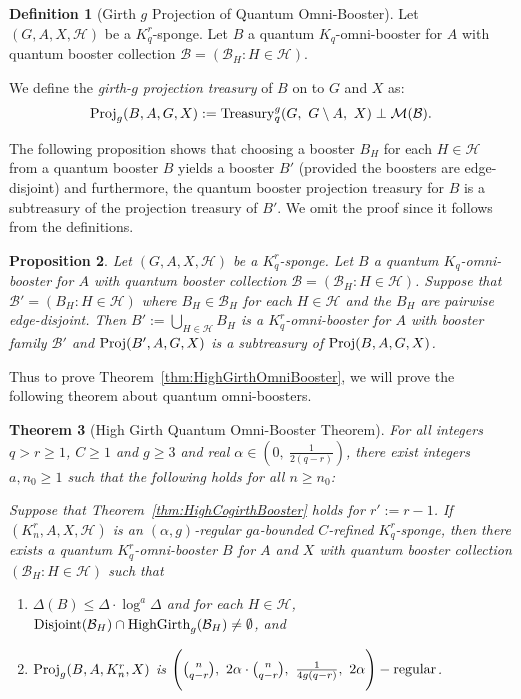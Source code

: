 \documentclass[11pt]{article}
\newcommand{\mc}[1]{\mathcal{#1}}
\newcounter{i}
\theoremstyle{plain}
\newtheorem{thm}{Theorem}[section]
\newtheorem{proposition}[thm]{Proposition}
\theoremstyle{plain} %
\theoremstyle{definition}
\newtheorem{definition}[thm]{Definition}
\begin{document}
\begin{definition}[Girth $g$ Projection of Quantum Omni-Booster]\label{def:QuantumOmniBoosterProj}
Let $(G,A,X,\mc{H})$ be a $K_q^r$-sponge. Let $B$ a quantum $K_q$-omni-booster for $A$ with quantum booster collection $\mathcal{B} = (\mathcal{B}_H: H\in\mathcal{H})$.

We define the \emph{girth-$g$ projection treasury} of $B$ on to $G$ and $X$ as: 
$${\rm Proj}_g(B,A,G,X):= {\rm Treasury}_q^g(G,~G\setminus A,~X) \perp \mathcal{M}(\mc{B}).$$
\end{definition}

The following proposition shows that choosing a booster $B_H$ for each $H\in \mathcal{H}$ from a quantum booster $B$ yields a booster $B'$ (provided the boosters are edge-disjoint) and furthermore, the quantum booster projection treasury for $B$ is a subtreasury of the projection treasury of $B'$. We omit the proof since it follows from the definitions.

\begin{proposition}\label{prop:QuantumSubTreasury}
Let $(G,A,X,\mc{H})$ be a $K_q^r$-sponge. Let $B$ a quantum $K_q$-omni-booster for $A$ with quantum booster collection $\mathcal{B} = (\mathcal{B}_H: H\in\mathcal{H})$. Suppose that $\mathcal{B}'=(B_H:H\in \mathcal{H})$ where $B_H\in \mathcal{B}_H$ for each $H\in \mathcal{H}$ and the $B_H$ are pairwise edge-disjoint. Then $B' := \bigcup_{H\in \mathcal{H}} B_H$ is a $K_q^r$-omni-booster for $A$ with booster family $\mathcal{B}'$ and ${\rm Proj}(B',A,G,X)$ is a subtreasury of ${\rm Proj}(B,A,G,X)$.    
\end{proposition}

Thus to prove Theorem~\ref{thm:HighGirthOmniBooster}, we will prove the following theorem about quantum omni-boosters.

\begin{thm}[High Girth Quantum Omni-Booster Theorem]\label{thm:HighGirthQuantumOmniBooster}
For all integers $q>r\ge 1$, $C\ge 1$ and $g\ge 3$ and real $\alpha \in \left(0,~\frac{1}{2(q-r)}\right)$, there exist integers $a, n_0\ge 1$ such that the following holds for all $n\ge n_0$: 

Suppose that Theorem~\ref{thm:HighCogirthBooster} holds for $r':=r-1$. If $(K_n^r, A, X,\mc{H})$ is an $(\alpha,g)$-regular $ga$-bounded $C$-refined $K_q^r$-sponge, then there exists a quantum $K_q^r$-omni-booster $B$ for $A$ and $X$ with quantum booster collection $(\mathcal{B}_H: H\in \mathcal{H})$ such that 
\begin{enumerate}
    \item[(1)] $\Delta(B)\le \Delta\cdot \log^{a} \Delta$ and for each $H\in \mathcal{H}$, ${\rm Disjoint}(\mc{B}_H) \cap {\rm HighGirth}_g(\mc{B}_H) \ne \emptyset$, and
    \item[(2)] ${\rm Proj}_g(B,A,K_n^r,X)$ is $\Bigg(\binom{n}{q-r},~2\alpha \cdot \binom{n}{q-r},~\frac{1}{4g(q-r)},~2\alpha\Bigg)-{\rm regular}$.
\end{enumerate} 
\end{thm}
\end{document}
